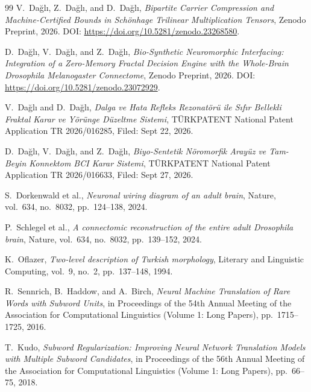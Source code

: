 \documentclass[11pt,letterpaper]{article}
\begin{document}
\begin{thebibliography}{99}
V.~Da\u{g}l\i, Z.~Da\u{g}l\i, and D.~Da\u{g}l\i,
\textit{Bipartite Carrier Compression and Machine-Certified Bounds in Sch\"{o}nhage Trilinear Multiplication Tensors},
Zenodo Preprint, 2026. DOI: \url{https://doi.org/10.5281/zenodo.23268580}.

D.~Da\u{g}l\i, V.~Da\u{g}l\i, and Z.~Da\u{g}l\i,
\textit{Bio-Synthetic Neuromorphic Interfacing: Integration of a Zero-Memory Fractal Decision Engine with the Whole-Brain Drosophila Melanogaster Connectome},
Zenodo Preprint, 2026. DOI: \url{https://doi.org/10.5281/zenodo.23072929}.

V.~Da\u{g}l\i{} and D.~Da\u{g}l\i,
\textit{Dalga ve Hata Refleks Rezonat\"{o}r\"{u} ile S\i{}f\i{}r Bellekli Fraktal Karar ve Y\"{o}r\"{u}nge D\"{u}zeltme Sistemi},
T\"{U}RKPATENT National Patent Application TR 2026/016285, Filed: Sept 22, 2026.

D.~Da\u{g}l\i, V.~Da\u{g}l\i, and Z.~Da\u{g}l\i,
\textit{Biyo-Sentetik N\"{o}romorfik Aray\"{u}z ve Tam-Beyin Konnektom BCI Karar Sistemi},
T\"{U}RKPATENT National Patent Application TR 2026/016633, Filed: Sept 27, 2026.

S.~Dorkenwald et al.,
\textit{Neuronal wiring diagram of an adult brain},
Nature, vol.~634, no.~8032, pp.~124--138, 2024.

P.~Schlegel et al.,
\textit{A connectomic reconstruction of the entire adult Drosophila brain},
Nature, vol.~634, no.~8032, pp.~139--152, 2024.

K.~Oflazer,
\textit{Two-level description of Turkish morphology},
Literary and Linguistic Computing, vol.~9, no.~2, pp.~137--148, 1994.

R.~Sennrich, B.~Haddow, and A.~Birch,
\textit{Neural Machine Translation of Rare Words with Subword Units},
in Proceedings of the 54th Annual Meeting of the Association for Computational Linguistics (Volume 1: Long Papers), pp.~1715--1725, 2016.

T.~Kudo,
\textit{Subword Regularization: Improving Neural Network Translation Models with Multiple Subword Candidates},
in Proceedings of the 56th Annual Meeting of the Association for Computational Linguistics (Volume 1: Long Papers), pp.~66--75, 2018.

\end{thebibliography}
\end{document}
